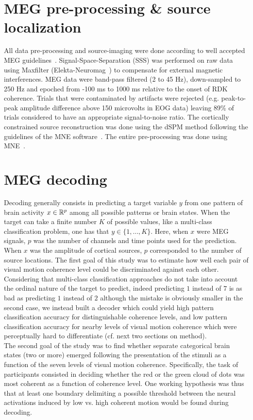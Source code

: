 \section{MEG pre-processing \& source localization}
All data pre-processing and source-imaging were done according to well accepted MEG guidelines~\cite{42gross2013good}. Signal-Space-Separation (SSS) was performed on raw data using Maxfilter (Elekta-Neuromag~\cite{43taulu2006spatiotemporal}) to compensate for external magnetic interferences. MEG data were band-pass filtered (2 to 45 Hz), down-sampled to 250 Hz and epoched from -100 ms to 1000 ms relative to the onset of RDK coherence. Trials that were contaminated by artifacts were rejected (e.g. peak-to-peak amplitude difference above 150 microvolts in EOG data) leaving 89\% of trials considered to have an appropriate signal-to-noise ratio. The cortically constrained source reconstruction was done using the dSPM method following the guidelines of the MNE software~\cite{44gramfort2014mne}. The entire pre-processing was done using MNE~\cite{45gramfort2013meg}.

\section{MEG decoding}
Decoding generally consists in predicting a target variable $y$
from one pattern of brain activity $x\in\mathbb{R}^p$ among all possible patterns or brain states.
When the target can take a finite number $K$ of possible values, like a multi-class classification problem, one has that $y \in\{1,\dots,K\}$. Here, when $x$ were MEG signals, $p$ was the number of channels and time points used for the prediction.
When $x$ was the amplitude of cortical sources, $p$ corresponded to the number of source locations.
The first goal of this study was to estimate how well each pair of visual motion coherence level could be discriminated against each other. Considering that multi-class classification approaches do not take into account the ordinal nature of the target to predict, indeed predicting $1$ instead of $7$ is as bad as predicting $1$ instead of $2$ although the mistake is obviously smaller in the second case, we instead built a decoder which could yield high pattern classification accuracy for distinguishable coherence levels, and low pattern classification accuracy for nearby levels of visual motion coherence which were perceptually hard to differentiate (cf. next two sections on method).\\
The second goal of the study was to find whether separate categorical brain states (two or more) emerged following the presentation of the stimuli as a function of the seven levels of visual motion coherence. Specifically, the task of participants consisted in deciding whether the red or the green cloud of dots was most coherent as a function of coherence level. One working hypothesis was thus that at least one boundary delimiting a possible threshold between the neural activations induced by low vs. high coherent motion would be found during decoding.

